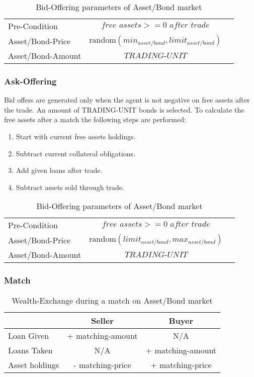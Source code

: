 \documentclass[Bachelorarbeit.tex]{subfiles}
\begin{document}
\begin{table}[H]
	\centering
	\caption{Bid-Offering parameters of Asset/Bond market}
	\begin{tabular} { l c r }
		\hline
		Pre-Condition & $\textit{free assets} >= \textit{0 after trade}$  \\
		Asset/Bond-Price & $\mathrm{random}(min_{asset/bond}, limit_{asset/bond})$ \\
		Asset/Bond-Amount & $\textit{TRADING-UNIT}$ \\
		\hline
	\end{tabular}
\end{table}

\subsubsection{Ask-Offering}
Bid offers are generated only when the agent is not negative on free assets after the trade. An amount of TRADING-UNIT bonds is selected. To calculate the free assets after a match the following steps are performed:

\begin{enumerate}
\item Start with current free assets holdings.
\item Subtract current collateral obligations.
\item Add given loans after trade.
\item Subtract assets sold through trade.
\end{enumerate}

\begin{table}[H]
	\centering
	\caption{Bid-Offering parameters of Asset/Bond market}
	\begin{tabular} { l c r }
		\hline
		Pre-Condition & $\textit{free assets} >= \textit{0 after trade}$  \\
		Asset/Bond-Price & $\mathrm{random}(limit_{asset/bond}, max_{asset/bond})$ \\
		Asset/Bond-Amount & $\textit{TRADING-UNIT}$ \\
		\hline
	\end{tabular}
\end{table}

\subsubsection{Match}

\begin{table}[H]
	\centering
	\caption{Wealth-Exchange during a match on Asset/Bond market}
	\begin{tabular} { l c c }
		& Seller & Buyer \\
		\hline
		Loan Given & + matching-amount & N/A \\
		Loans Taken & N/A & + matching-amount \\
		Asset holdings & - matching-price & + matching-price \\
		\hline
	\end{tabular}
\end{table}
\end{document}
